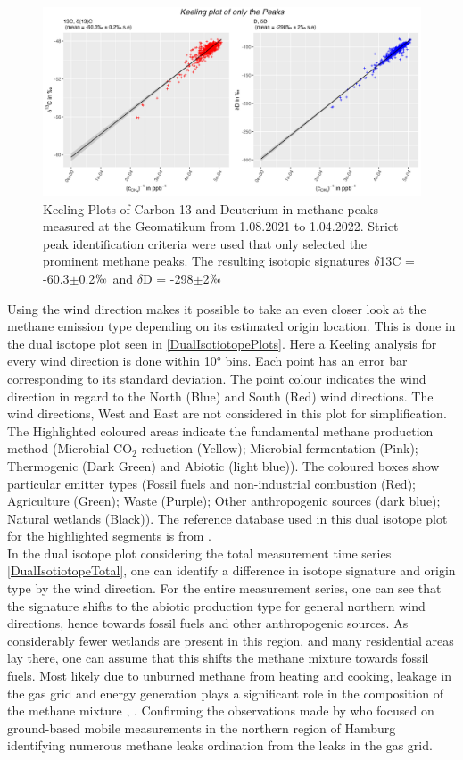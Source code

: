 \begin{figure}[htbp]
 \centering
 \includegraphics[width=1\textwidth]{figures/Appendix/Keeling/11_Keeling_Plot_Peaks_medium_peaks.png}
 \caption[Keeling Plot for CH$_4$ peaks in CR-IRMS measument]{Keeling Plots of Carbon-13 and Deuterium in methane peaks measured at the Geomatikum from 1.08.2021 to 1.04.2022. Strict peak identification criteria were used that only selected the prominent methane peaks. The resulting isotopic signatures $\delta$13C = -60.3$\pm $0.2$\permil$ and $\delta$D = -298$\pm $2$\permil$}
 \label{PeaksKeelingPlot}
\end{figure}
Using the wind direction makes it possible to take an even closer look at the methane emission type depending on its estimated origin location. This is done in the dual isotope plot seen in \cref{DualIsotiotopePlots}. Here a Keeling analysis for every wind direction is done within 10° bins. Each point has an error bar corresponding to its standard deviation. The point colour indicates the wind direction in regard to the North (Blue) and South (Red) wind directions. The wind directions, West and East are not considered in this plot for simplification. The Highlighted coloured areas indicate the fundamental methane production method (Microbial CO$_2$ reduction (Yellow); Microbial fermentation (Pink); Thermogenic (Dark Green) and Abiotic (light blue)). The coloured boxes show particular emitter types (Fossil fuels and non-industrial combustion (Red); Agriculture (Green); Waste (Purple); Other anthropogenic sources (dark blue); Natural wetlands (Black)). The reference database used in this dual isotope plot for the highlighted segments is from \cite{Menoud.2021}.\\
In the dual isotope plot considering the total measurement time series \cref{DualIsotiotopeTotal}, one can identify a difference in isotope signature and origin type by the wind direction. For the entire measurement series, one can see that the signature shifts to the abiotic production type for general northern wind directions, hence towards fossil fuels and other anthropogenic sources. As considerably fewer wetlands are present in this region, and many residential areas lay there, one can assume that this shifts the methane mixture towards fossil fuels. Most likely due to unburned methane from heating and cooking, leakage in the gas grid and energy generation plays a significant role in the composition of the methane mixture \cite{Lebel.2022}, \cite{Dietrich.2023}. Confirming the observations made by \cite{Maazallahi.2020} who focused on ground-based mobile measurements in the northern region of Hamburg identifying numerous methane leaks ordination from the leaks in the gas grid.
